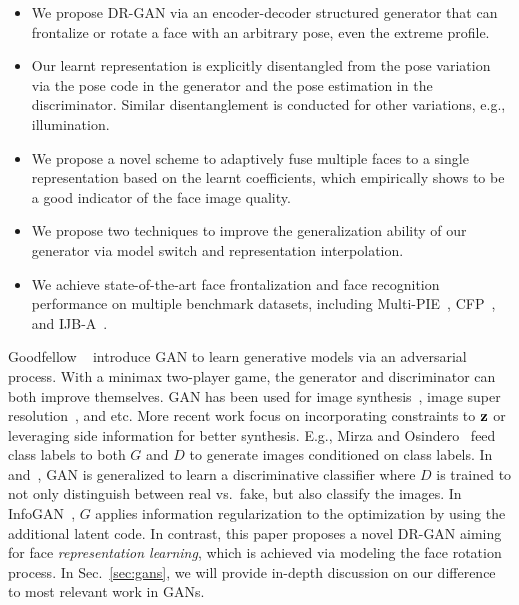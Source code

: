 \documentclass[10pt,journal,compsoc]{IEEEtran}
\begin{document}
\begin{itemize}
 \item We propose DR-GAN via an encoder-decoder structured generator that can frontalize or rotate a face with an arbitrary pose, even the extreme profile.

 \item Our learnt representation is explicitly disentangled from the pose variation via the pose code in the generator and the pose estimation in the discriminator. 
Similar disentanglement is conducted for other variations, e.g., illumination.

 \item We propose a novel scheme to adaptively fuse multiple faces to a single representation based on the learnt coefficients, which empirically shows to be a good indicator of the face image quality. 

 \item We propose two techniques to improve the generalization ability of our generator via model switch and representation interpolation. 

 \item We achieve state-of-the-art face frontalization and face recognition performance on multiple benchmark datasets, including Multi-PIE~\cite{gross2010multi}, CFP~\cite{sengupta2016frontal}, and IJB-A~\cite{klare2015pushing}.
\end{itemize}
Goodfellow \etal~\cite{goodfellow2014generative} introduce GAN to learn generative models via an adversarial process. 
With a minimax two-player game, the generator and discriminator can both improve themselves. 
GAN has been used for image synthesis~\cite{denton2015deep,reed2016generative}, image super resolution~\cite{yu2016ultra}, and etc. 
More recent work focus on incorporating constraints to $\bf{z}$ or leveraging side information for better synthesis. 
E.g., Mirza and Osindero~\cite{mirza2014conditional} feed class labels to both $G$ and $D$ to generate images conditioned on class labels. 
In~\cite{salimans2016improved} and~\cite{odena2016semi}, GAN is generalized to learn a discriminative classifier where $D$ is trained to not only distinguish between real vs.~fake, but also classify the images. 
In InfoGAN~\cite{chen2016infogan}, $G$ applies information regularization to the optimization by using the additional latent code. In contrast, this paper proposes a novel DR-GAN aiming for face {\it representation learning}, 
which is achieved via modeling the face rotation process. In Sec.~\ref{sec:gans}, we will provide in-depth discussion on our difference to most relevant work in GANs.
\end{document}

